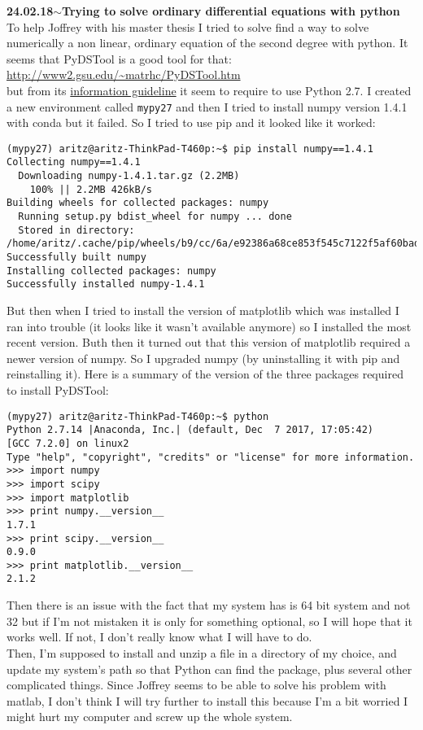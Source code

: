 \documentclass[11pt,a4paper]{article}
\newenvironment{loggentry}[2]%
{\noindent\textbf{#1}\hspace{1cm}$\mathbf{\sim}$\text{ }\textbf{#2}\\}{\vspace{0.5cm}}
\begin{document}
\begin{loggentry}{24.02.18}{Trying to solve ordinary differential equations with python}
To help Joffrey with his master thesis I tried to solve find a way to solve numerically a non linear, ordinary equation of the second degree with python. It seems that PyDSTool is a good tool for that:\\
\url{http://www2.gsu.edu/~matrhc/PyDSTool.htm}\\
but from its \href{http://www2.gsu.edu/~matrhc/GettingStarted.html}{information guideline} it seem to require to use Python 2.7. I created a new environment called \texttt{mypy27} and then I tried to install numpy version 1.4.1 with conda but it failed. So I tried to use pip and it looked like it worked:\\
\begin{verbatim}
(mypy27) aritz@aritz-ThinkPad-T460p:~$ pip install numpy==1.4.1
Collecting numpy==1.4.1
  Downloading numpy-1.4.1.tar.gz (2.2MB)
    100% || 2.2MB 426kB/s 
Building wheels for collected packages: numpy
  Running setup.py bdist_wheel for numpy ... done
  Stored in directory: /home/aritz/.cache/pip/wheels/b9/cc/6a/e92386a68ce853f545c7122f5af60bad31709a48747cc07443
Successfully built numpy
Installing collected packages: numpy
Successfully installed numpy-1.4.1
\end{verbatim}
But then when I tried to install the version of matplotlib which was installed I ran into trouble (it looks like it wasn't available anymore) so I installed the most recent version. Buth then it turned out that this version of matplotlib required a newer version of numpy. So I upgraded numpy (by uninstalling it with pip and reinstalling it). Here is a summary of the version of the three packages required to install PyDSTool:
\begin{verbatim}
(mypy27) aritz@aritz-ThinkPad-T460p:~$ python 
Python 2.7.14 |Anaconda, Inc.| (default, Dec  7 2017, 17:05:42) 
[GCC 7.2.0] on linux2
Type "help", "copyright", "credits" or "license" for more information.
>>> import numpy
>>> import scipy
>>> import matplotlib
>>> print numpy.__version__
1.7.1
>>> print scipy.__version__
0.9.0
>>> print matplotlib.__version__
2.1.2
\end{verbatim}
Then there is an issue with the fact that my system has is 64 bit system and not 32 but if I'm not mistaken it is only for something optional, so I will hope that it works well. If not, I don't really know what I will have to do.\\
Then, I'm supposed to install and unzip a file in a directory of my choice, and update my system's path so that Python can find the package, plus several other complicated things. Since Joffrey seems to be able to solve his problem with matlab, I don't think I will try further to install this because I'm a bit worried I might hurt my computer and screw up the whole system.\\

\end{loggentry}
\end{document}
